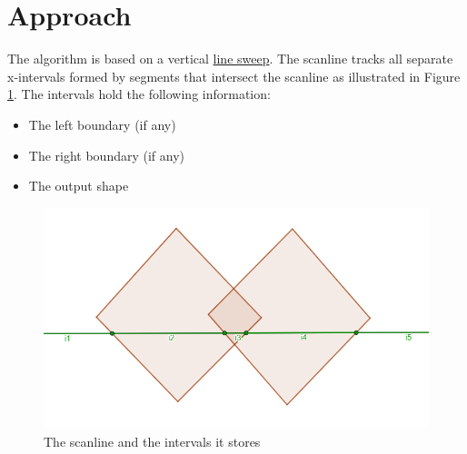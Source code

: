 \documentclass[12pt]{article}
\begin{document}
\newpage
\section*{Approach}

The algorithm is based on a vertical \href{https://en.wikipedia.org/wiki/Sweep_line_algorithm}{line sweep}. The scanline tracks all separate x-intervals formed by segments that intersect the scanline as illustrated in Figure \ref{fig:intersectionScanline}. The intervals hold the following information:
\begin{itemize}
    \item The left boundary (if any)
    \item The right boundary (if any)
    \item The output shape
\end{itemize}
\begin{figure}[!htb]
    \includegraphics[width=\linewidth]{Images/intersection_scanline.png}
    \caption{The scanline and the intervals it stores}
    \label{fig:intersectionScanline}
\end{figure}
\end{document}
